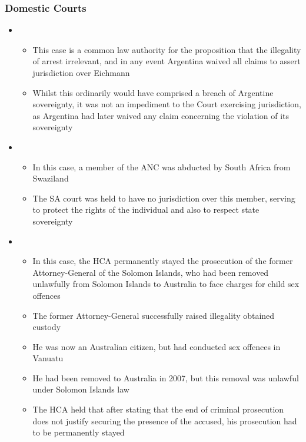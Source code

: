 \subsubsection{Domestic Courts}
\begin{itemize}
    \item {}
    \begin{itemize}
        \item This case is a common law authority for the proposition that the illegality of arrest irrelevant, and in any event Argentina waived all claims to assert jurisdiction over Eichmann
        \item Whilst this ordinarily would have comprised a breach of Argentine sovereignty, it was not an impediment to the Court exercising jurisdiction, as Argentina had later waived any claim concerning the violation of its sovereignty
    \end{itemize}
    \item {}
    \begin{itemize}
        \item In this case, a member of the ANC was abducted by South Africa from Swaziland
        \item The SA court was held to have no jurisdiction over this member, serving to protect the rights of the individual and also to respect state sovereignty
    \end{itemize}
    \item {}
    \begin{itemize}
        \item In this case, the HCA permanently stayed the prosecution of the former Attorney-General of the Solomon Islands, who had been removed unlawfully from Solomon Islands to Australia to face charges for child sex offences
        \item The former Attorney-General successfully raised illegality obtained custody
        \item He was now an Australian citizen, but had conducted sex offences in Vanuatu
        \item He had been removed to Australia in 2007, but this removal was unlawful under Solomon Islands law
        \item The HCA held that after stating that the end of criminal prosecution does not justify securing the presence of the accused, his prosecution had to be permanently stayed
    \end{itemize}
\end{itemize}

